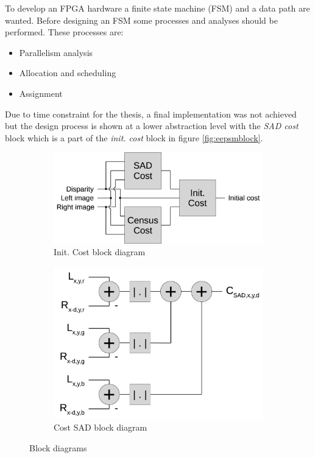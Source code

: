 To develop an FPGA hardware a finite state machine (FSM) and a data path are wanted. Before designing an FSM some processes and analyses should be performed. These processes are:
\begin{itemize}
\item Parallelism analysis
\item Allocation and scheduling
\item Assignment
\end{itemize}

Due to time constraint for the thesis, a final implementation was not achieved but the design process is shown at a lower abstraction level with the \textit{SAD cost} block which is a part of the \textit{init. cost} block in figure \vref{fig:eepsmblock}. 
\begin{figure}[ht]
  \centering
  \begin{subfigure}[t]{0.45\textwidth}
    \centering\includegraphics[scale=0.25]{figures/initcostblock.jpg}
    \caption{Init. Cost block diagram\label{fig:initcostblock}}
  \end{subfigure}\hspace{0.5cm}
  \begin{subfigure}[t]{0.45\textwidth}
    \centering\includegraphics[scale=0.25]{figures/sadcostblock.jpg}
    \caption{Cost SAD block diagram\label{fig:sadcostblock}}
  \end{subfigure}
  \caption{Block diagrams\label{fig:initsadblock}}
\end{figure}

